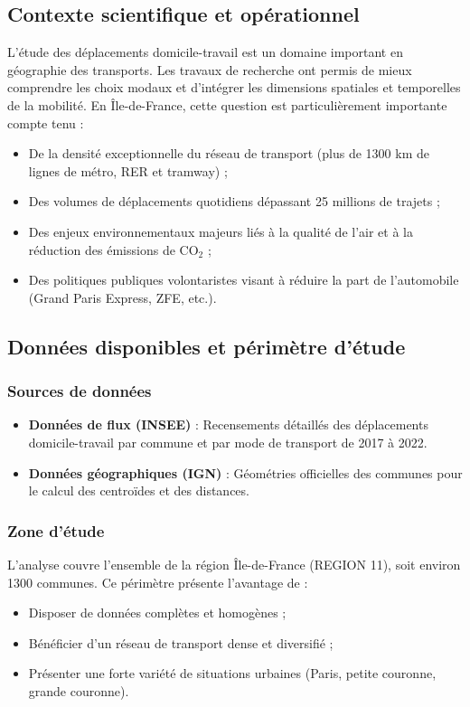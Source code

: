 \documentclass[11pt,a4paper]{article}
\begin{document}
\subsection{Contexte scientifique et opérationnel}
L'étude des déplacements domicile-travail est un domaine important en géographie des transports. Les travaux de recherche ont permis de mieux comprendre les choix modaux et d'intégrer les dimensions spatiales et temporelles de la mobilité.
En Île-de-France, cette question est particulièrement importante compte tenu :
\begin{itemize}[label=\textbullet]
    \item De la densité exceptionnelle du réseau de transport (plus de 1300 km de lignes de métro, RER et tramway) ;
    \item Des volumes de déplacements quotidiens dépassant 25 millions de trajets ;
    \item Des enjeux environnementaux majeurs liés à la qualité de l'air et à la réduction des émissions de CO$_2$ ;
    \item Des politiques publiques volontaristes visant à réduire la part de l'automobile (Grand Paris Express, ZFE, etc.).
\end{itemize}
\subsection{Données disponibles et périmètre d'étude}
\subsubsection{Sources de données}
\begin{itemize}[label=\textbullet]
    \item \textbf{Données de flux (INSEE)} : Recensements détaillés des déplacements domicile-travail par commune et par mode de transport de 2017 à 2022.
    \item \textbf{Données géographiques (IGN)} : Géométries officielles des communes pour le calcul des centroïdes et des distances.
\end{itemize}
\subsubsection{Zone d'étude}
L'analyse couvre l'ensemble de la région Île-de-France (REGION 11), soit environ 1300 communes. Ce périmètre présente l'avantage de :
\begin{itemize}[label=\textbullet]
    \item Disposer de données complètes et homogènes ;
    \item Bénéficier d'un réseau de transport dense et diversifié ;
    \item Présenter une forte variété de situations urbaines (Paris, petite couronne, grande couronne).
\end{itemize}
\end{document}
